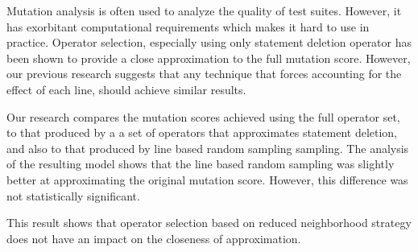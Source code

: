 Mutation analysis is often used to analyze the quality of test suites. However, it has exorbitant computational requirements which makes it hard to use in practice. Operator selection, especially using only statement deletion operator has been shown to provide a close approximation to the full mutation score.
However, our previous research suggests that any technique that forces accounting for the effect of each line, should achieve similar results.

Our research compares the mutation scores achieved using the full operator set, to that produced by a a set of operators that approximates statement deletion, and also to that produced by line based random sampling sampling.
The analysis of the resulting model shows that the line based random sampling was slightly better at approximating the original mutation score. However, this difference was not statistically significant.


This result shows that operator selection based on reduced neighborhood strategy does not have an impact on the closeness of approximation.

